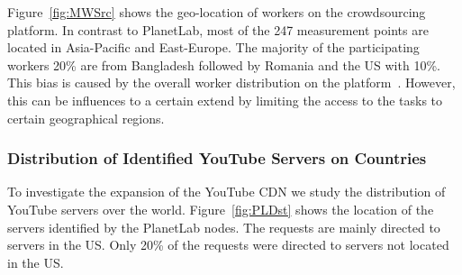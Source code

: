 
Figure~\ref{fig:MWSrc} shows the geo-location of workers on the crowdsourcing platform.
In contrast to PlanetLab, most of the 247 measurement points are located in Asia-Pacific and East-Europe.
The majority of the participating workers 20\% are from Bangladesh followed by Romania and the US with 10\%.
This bias is caused by the overall worker distribution on the platform~\cite{conf2011-410}. However, this can be influences to a certain extend by limiting the access to the tasks to certain geographical regions.

\subsubsection{Distribution of Identified YouTube Servers on Countries}

To investigate the expansion of the YouTube CDN we study the distribution of YouTube servers over the world.
Figure~\ref{fig:PLDst} shows the location of the servers identified by the PlanetLab nodes.
The requests are mainly directed to servers in the US. Only 20\% of the requests were directed to servers not located in the US.

